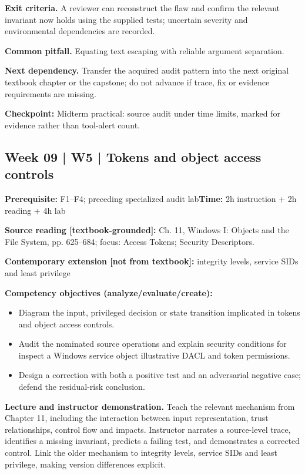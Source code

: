 \documentclass[10pt,letterpaper]{article}
\begin{document}
\textbf{Exit criteria.} A reviewer can reconstruct the flaw and confirm the relevant invariant now holds using the supplied tests; uncertain severity and environmental dependencies are recorded.

\textbf{Common pitfall.} Equating text escaping with reliable argument separation.

\textbf{Next dependency.} Transfer the acquired audit pattern into the next original textbook chapter or the capstone; do not advance if trace, fix or evidence requirements are missing.

\begin{historynote}\textbf{Checkpoint:} Midterm practical: source audit under time limits, marked for evidence rather than tool-alert count.\end{historynote}
\subsection{Week 09 | W5 | Tokens and object access controls}
\textbf{Prerequisite:} F1--F4; preceding specialized audit lab\hfill\textbf{Time:} 2h instruction + 2h reading + 4h lab

\textbf{Source reading [textbook-grounded]:} Ch. 11, Windows I: Objects and the File System, pp. 625--684; focus: Access Tokens; Security Descriptors.

\textbf{Contemporary extension [not from textbook]:} integrity levels, service SIDs and least privilege

\textbf{Competency objectives (analyze/evaluate/create):}
\begin{itemize}[leftmargin=*,itemsep=2pt]
\item Diagram the input, privileged decision or state transition implicated in tokens and object access controls.
\item Audit the nominated source operations and explain security conditions for inspect a Windows service object illustrative DACL and token permissions.
\item Design a correction with both a positive test and an adversarial negative case; defend the residual-risk conclusion.
\end{itemize}
\textbf{Lecture and instructor demonstration.} Teach the relevant mechanism from Chapter 11, including the interaction between input representation, trust relationships, control flow and impacts. Instructor narrates a source-level trace, identifies a missing invariant, predicts a failing test, and demonstrates a corrected control. Link the older mechanism to integrity levels, service SIDs and least privilege, making version differences explicit.
\end{document}
